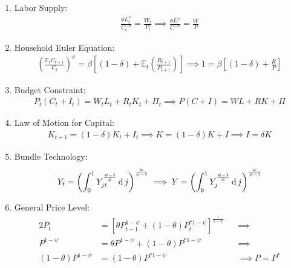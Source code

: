\documentclass[
thesis.tex
]{subfiles}
\begin{document}
	\begin{enumerate}
		\item Labor Supply:
		\begin{align}
			\label{eq:ss-household-labor-supply}
			\frac{\phi L_t^{\varphi}}{C_t^{-\sigma}} = \frac{W_t}{P_t} \implies
			\frac{\phi L^{\varphi}}{C^{-\sigma}} = \frac{W}{P}
		\end{align}
		
		\item Household Euler Equation: 
		\begin{align}
			\label{eq:ss-household-euler-equation}
			\left( \frac{\mathbb{E}_t C_{t+1}}{C_t} \right)^\sigma = \beta \left[ (1-\delta) + \mathbb{E}_t \left(\frac{R_{t+1}}{P_{t+1}}\right) \right] \implies 
			1 = \beta \left[ (1-\delta) + \frac{R}{P} \right]
		\end{align}
		
		\item Budget Constraint: 
		\begin{align}
			\label{eq:ss-household-budget-constraint}
			P_t (C_t + I_t) = W_t L_t + R_t K_t + \Pi_t \implies 
			P (C + I) = W L + R K + \Pi
		\end{align}
		
		\item Law of Motion for Capital:
		\begin{align}
			\label{eq:ss-law-of-motion-for-capital}
			K_{t+1} = (1-\delta)K_t + I_t \implies
			K = (1-\delta)K + I \implies I = \delta K
		\end{align}
		
		\item Bundle Technology:
		\begin{align}
			\label{eq:ss-final-good-firm-bundle-rule}
			Y_t = \left( \int_{0}^{1} Y_{jt}^{\frac{\psi-1}{\psi}} \operatorname{d} j \right)^{\frac{\psi}{\psi-1}} \implies 
			Y = \left( \int_{0}^{1} Y_{j}^{\frac{\psi-1}{\psi}} \operatorname{d} j \right)^{\frac{\psi}{\psi-1}}
		\end{align}
		
		\item General Price Level:
		\begin{alignat}{2}
			\label{eq:ss-general-price-level}
			P_t &= \left[ \theta P_{t-1}^{1-\psi} + (1-\theta) P_t^{\ast 1-\psi} \right]^\frac{1}{1-\psi} &&\implies \nonumber \\
			P^{1-\psi} &= \theta P^{1-\psi} + (1-\theta) P^{\ast 1-\psi} &&\implies \nonumber \\ 
			(1-\theta) P^{1-\psi} &= (1-\theta) P^{\ast 1-\psi} &&\implies P = P^\ast
		\end{alignat}
		

\end{enumerate}
\end{document}
